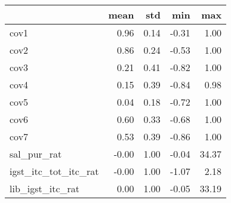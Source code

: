 \begin{tabular}{lrrrr}
\toprule
{} &  mean &   std &   min &    max \\
\midrule
cov1                 &  0.96 &  0.14 & -0.31 &   1.00 \\
cov2                 &  0.86 &  0.24 & -0.53 &   1.00 \\
cov3                 &  0.21 &  0.41 & -0.82 &   1.00 \\
cov4                 &  0.15 &  0.39 & -0.84 &   0.98 \\
cov5                 &  0.04 &  0.18 & -0.72 &   1.00 \\
cov6                 &  0.60 &  0.33 & -0.68 &   1.00 \\
cov7                 &  0.53 &  0.39 & -0.86 &   1.00 \\
sal\_pur\_rat          & -0.00 &  1.00 & -0.04 &  34.37 \\
igst\_itc\_tot\_itc\_rat & -0.00 &  1.00 & -1.07 &   2.18 \\
lib\_igst\_itc\_rat     &  0.00 &  1.00 & -0.05 &  33.19 \\
\bottomrule
\end{tabular}
